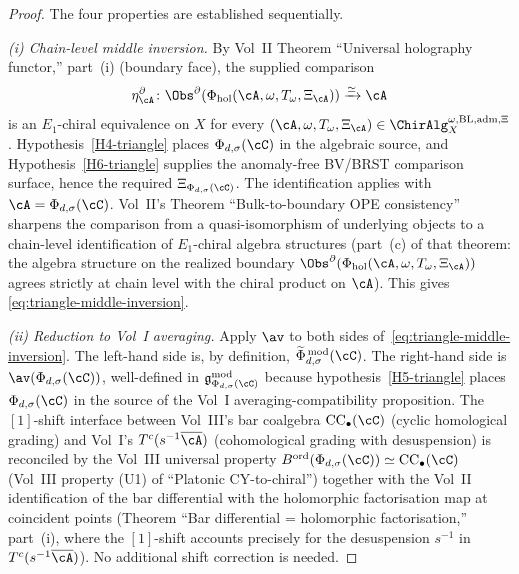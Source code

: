 \begin{proof}
The four properties are established sequentially.

\smallskip
\emph{\textup{(i)} Chain-level middle inversion.} By Vol~II
Theorem ``Universal holography functor,'' part~(i) (boundary face),
the supplied comparison
\[
\eta^\partial_\cA\colon
\Obs^\partial(\Phi_{\mathrm{hol}}(\cA,\omega,T_\omega,\Xi_\cA))
\xrightarrow{\simeq}\cA
\]
is an $E_1$-chiral equivalence on $X$ for every
\((\cA,\omega,T_\omega,\Xi_\cA)\in
\ChirAlg^{\omega,\mathrm{BL,adm},\Xi}_X\).
Hypothesis~\textup{\ref{H4-triangle}} places
\(\Phi_{d,\sigma}(\cC)\) in the algebraic source, and
Hypothesis~\textup{\ref{H6-triangle}} supplies the anomaly-free
BV/BRST comparison surface, hence the required
\(\Xi_{\Phi_{d,\sigma}(\cC)}\). The identification applies with
\(\cA = \Phi_{d,\sigma}(\cC)\). Vol~II's Theorem
``Bulk-to-boundary OPE consistency'' sharpens the comparison from a
quasi-isomorphism of underlying objects to a chain-level
identification of $E_1$-chiral algebra structures \textup{(}part~(c)
of that theorem: the algebra structure on the realized boundary
\(\Obs^\partial(\Phi_{\mathrm{hol}}(\cA,\omega,T_\omega,\Xi_\cA))\)
agrees strictly at chain level with the chiral product on
\(\cA\)\textup{).} This gives
\eqref{eq:triangle-middle-inversion}.

\smallskip
\emph{\textup{(ii)} Reduction to Vol~I averaging.}
Apply $\av$ to both sides of~\eqref{eq:triangle-middle-inversion}.
The left-hand side is, by definition,
$\widetilde\Phi_{d,\sigma}^{\,\mathrm{mod}}(\cC)$. The right-hand side is
$\av(\Phi_{d,\sigma}(\cC))$, well-defined in
$\mathfrak{g}^{\mathrm{mod}}_{\Phi_{d,\sigma}(\cC)}$ because
hypothesis~\textup{\ref{H5-triangle}} places $\Phi_{d,\sigma}(\cC)$ in the
source of the Vol~I averaging-compatibility proposition. The
$[1]$-shift interface between Vol~III's bar coalgebra
$\mathrm{CC}_\bullet(\cC)$ \textup{(}cyclic homological grading\textup{)}
and Vol~I's $T^c(s^{-1}\overline{\cA})$ \textup{(}cohomological
grading with desuspension\textup{)} is reconciled by the Vol~III
universal property $B^{\mathrm{ord}}(\Phi_{d,\sigma}(\cC)) \simeq
\mathrm{CC}_\bullet(\cC)$ \textup{(}Vol~III property
\textup{(U1)} of ``Platonic CY-to-chiral''\textup{)} together with
the Vol~II identification of the bar differential with the
holomorphic factorisation map at coincident points
\textup{(}Theorem ``Bar differential = holomorphic factorisation,''
part~(i), where the $[1]$-shift accounts precisely for the
desuspension $s^{-1}$ in $T^c(s^{-1}\overline{\cA})$\textup{).}
No additional shift correction is needed.


\end{proof}
